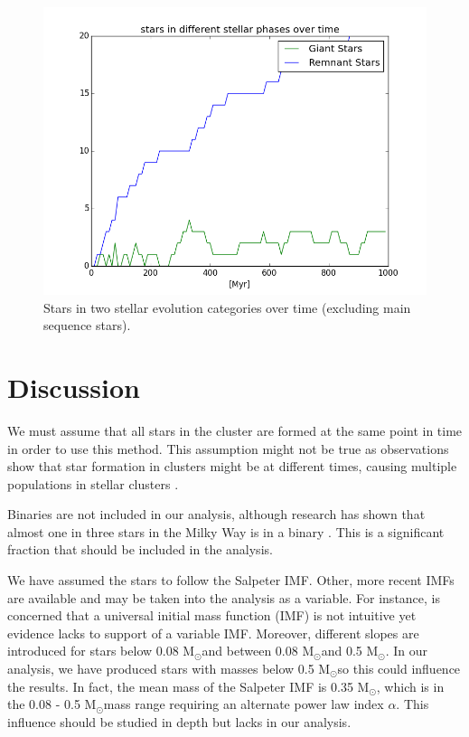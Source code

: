 \documentclass{aa}
\newcommand{\Sun}[0]{\ensuremath{_{\odot}}}
\begin{document}
\begin{figure}
    \centering
    \includegraphics[width=\hsize]{img/stellar_phases_counts_without_main_sequence.png}
    \caption{Stars in two stellar evolution categories over time (excluding main sequence stars).}\label{fig:phases_without_ms}
\end{figure}

\section{Discussion}\label{sec:discussion}
We must assume that all stars in the cluster are formed at the same point in time in order to use this method. This assumption might not be true as observations show that star formation in clusters might be at different times, causing multiple populations in stellar clusters \citep{2009IAUS..258..233P}.

Binaries are not included in our analysis, although research has shown that almost one in three stars in the Milky Way is in a binary \citep{2006ApJ...640L..63L}. This is a significant fraction that should be included in the analysis.

We have assumed the stars to follow the Salpeter IMF. Other, more recent IMFs are available \citep[e.g.][]{1979ApJS...41..513M, 2001ASPC..228..187K, 2001MNRAS.322..231K} and may be taken into the analysis as a variable.
For instance, \citet{2001MNRAS.322..231K} is concerned that a universal initial mass function (IMF) is not intuitive yet evidence lacks to support of a variable IMF. Moreover, different slopes are introduced for stars below 0.08 M\Sun and between 0.08 M\Sun and 0.5 M\Sun. In our analysis, we have produced stars with masses below 0.5 M\Sun so this could influence the results. In fact, the mean mass of the Salpeter IMF is 0.35 M\Sun, which is in the 0.08 - 0.5 M\Sun mass range requiring an alternate power law index $\alpha$. This influence should be studied in depth but lacks in our analysis.
\end{document}

